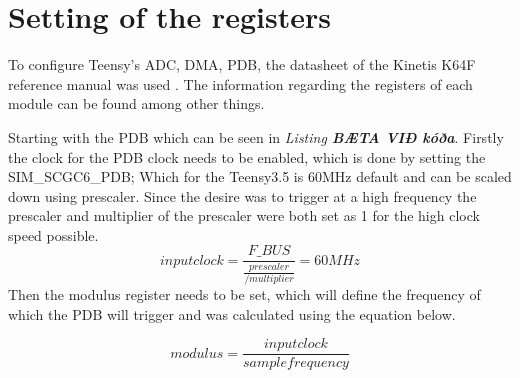 \chapter{Setting of the registers}\label{sec:codeExplain}
To configure Teensy's ADC, DMA, PDB, the datasheet of the Kinetis K64F reference manual was used \cite{freescale_semiconductor_kinetis_2021}.
The information regarding the registers of each module can be found among other things.

Starting with the PDB  which can be seen in \textit{Listing \textbf{BÆTA VIÐ kóða}}.
Firstly the clock for the PDB clock needs to be enabled, which is done by setting the SIM\_SCGC6\_PDB;
Which for the Teensy3.5 is 60MHz default and can be scaled down using prescaler.
Since the desire was to trigger at a high frequency the prescaler and multiplier of the prescaler were both set as 1 for the high clock speed possible.
\textbf{$$input clock = \frac{F\_BUS}{\frac{prescaler}{/multiplier}} = 60MHz$$}
Then the modulus register needs to be set, which will define the frequency of which the PDB will trigger and was calculated using the equation below.

$$modulus = \frac{input clock}{sample frequency}$$

